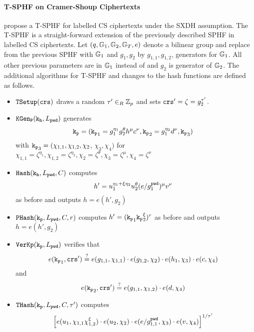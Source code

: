 \paragraph{\ac{T-SPHF} on Cramer-Shoup Ciphertexts}
\citet{Benhamouda2013} propose a \ac{T-SPHF} for labelled \ac{CS} ciphertexts under the \ac{SXDH} assumption.
The \ac{T-SPHF} is a straight-forward extension of the previously described \ac{SPHF} in labelled \ac{CS} ciphertexts.
Let $(q, \mathbb{G}_1, \mathbb{G}_2, \mathbb{G}_T, e)$ denote a bilinear group and replace \GG from the previous \ac{SPHF} with $\mathbb{G}_1$ and $g_1,g_2$ by $g_{1,1},g_{1,2}$, generators for $\mathbb{G}_1$.
All other previous parameters are in $\mathbb{G}_1$ instead of \GG and $g_2$ is generator of $\mathbb{G}_2$.
The additional algorithms for \ac{T-SPHF} and changes to the hash functions are defined as follows.
\begin{itemize}
  \item $\mathtt{TSetup}(\mathtt{crs})$ draws a random $\tau'\in_R\mathbb{Z}_p$ and sets $\mathtt{crs}'=\zeta=g_2^{\tau'}$.
  \item $\mathtt{KGen_P}(\mathtt{k_h}, L_\mathtt{pwd})$ generates 
      \[\mathtt{k_p}=(\mathtt{k_p}_1=g_1^{\eta_1} g_2^{\theta} h^\mu c^\nu, \mathtt{k_p}_2=g_1^{\eta_2} d^{\nu}, \mathtt{k_p}_3)\] with 
      $\mathtt{k_p}_3=(\chi_{1,1}, \chi_{1,2}, \chi_2$, $\chi_3, \chi_4)$ for 
      $\chi_{1,1}={\zeta}^{\eta_1}, \chi_{1,2}={\zeta}^{\eta_2}, \chi_2={\zeta}^{\theta}, \chi_3={\zeta}^{\mu}, \chi_4={\zeta}^{\nu}$
  \item $\mathtt{Hash}(\mathtt{k_h}, L_\mathtt{pwd}, C)$ computes 
      \[h'=u_1^{\eta_1+\xi\eta_2} u_2^{\theta} (e/g_1^{\mathtt{pwd}})^\mu v^\nu\] 
      as before and outputs $h=e(h',g_2)$
  \item $\mathtt{PHash}(\mathtt{k_p}, L_\mathtt{pwd}, C, r)$ computes $h'=(\mathtt{k_p}_1 \mathtt{k_p}_2^\xi)^r$ as before and outputs $h=e(h',g_2)$
  \item $\mathtt{VerKp}(\mathtt{k_p}, L_\mathtt{pwd})$ verifies that 
      \[e(\mathtt{k_p}_1, \mathtt{crs}')\stackrel{?}{=} e(g_{1,1}, \chi_{1,1})\cdot e(g_{1,2}, \chi_2)\cdot e(h_1, \chi_3)\cdot e(c, \chi_4)\] and
      \[e(\mathtt{k_p}_2, \mathtt{crs}') \stackrel{?}{=} e(g_{1,1}, \chi_{1,2})\cdot e(d, \chi_4)\]
  \item $\mathtt{THash}(\mathtt{k_p}, L_\mathtt{pwd}, C, \tau')$ computes 
  \[\left[ e(u_1, \chi_{1,1} \chi_{1,2}^{\xi})\cdot e(u_2, \chi_2)\cdot e(e/g_{1,1}^{\mathtt{pwd}}, \chi_3)\cdot e(v, \chi_4) \right]^{1/\tau'}\]
\end{itemize}
